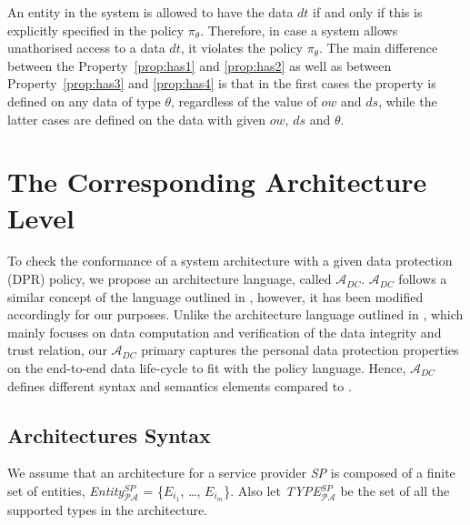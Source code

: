 \documentclass[a4paper]{article}
\begin{document}
An entity in the system is allowed to have the data $dt$ if and only if this is explicitly specified in the policy $\pi_{\theta}$. Therefore, in case a system allows unathorised access to a data $dt$, it violates the policy  $\pi_{\theta}$. The main difference between the Property~\ref{prop:has1} and \ref{prop:has2} as well as between  Property~\ref{prop:has3} and \ref{prop:has4} is that in the first cases the property is defined on any data of type $\theta$, regardless of the value of $ow$ and $ds$, while the latter cases are defined on the data with given $ow$, $ds$ and $\theta$. 

\section{The Corresponding Architecture Level}
\label{sec:arch0}

To check the conformance of a system architecture with a given data protection (DPR) policy, we propose an architecture language, called  $\mathcal{A}_{DC}$. $\mathcal{A}_{DC}$ follows a similar concept of the language outlined in \cite{TaAntignac14}, however, it has been modified accordingly for our purposes. Unlike the architecture language outlined in \cite{Antignac14, TaAntignac14}, which mainly focuses on data computation and verification of the data integrity and trust relation, our $\mathcal{A}_{DC}$ primary captures the personal data protection properties on the end-to-end data life-cycle to fit with the policy language. Hence, $\mathcal{A}_{DC}$ defines different syntax and semantics elements compared to \cite{TaAntignac14, Antignac14}.  

\subsection{Architectures Syntax}
\label{sec:syntax0}

We assume that an architecture for a service provider \textit{SP} is composed of a finite set of entities, \textit{Entity}$^{SP}_{\mathcal{P}\mathcal{A}}$ = \{$E_{i_1}$, \dots, $E_{i_m}$\}.  Also let \textit{TYPE}$^{SP}_{\mathcal{P}\mathcal{A}}$ be the set of all the supported types in the architecture.    
\end{document}
